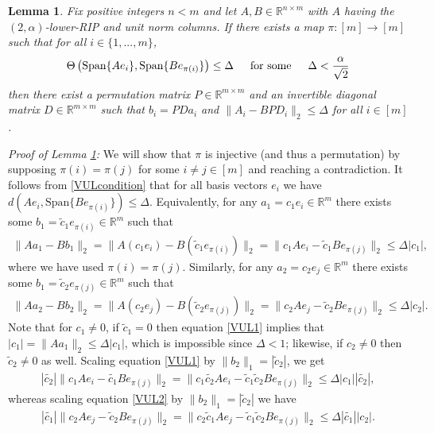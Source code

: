 \documentclass[journal,onecolumn]{IEEEtran}
\newtheorem{lemma}{Lemma}
\begin{document}

\begin{lemma}\label{VectorUniquenessLemma}
Fix positive integers $n < m$ and let $A,B \in \mathbb{R}^{n \times m}$ with $A$ having the $(2,\alpha)$-lower-RIP and unit norm columns. If there exists a map $\pi: [m] \to [m]$ such that for all $i \in \{1, ..., m \}$,
\begin{align}\label{VULcondition}
\Theta\left( \text{Span}\{Ae_i\}, \text{Span}\{Be_{\pi(i)}\} \right) \leq \Delta \indent \text{for some} \indent \Delta < \frac{\alpha}{\sqrt{2}} 
\end{align}
%
then there exist a permutation matrix $P \in \mathbb{R}^{m \times m}$ and an invertible diagonal matrix $D \in \mathbb{R}^{m \times m}$ such that $b_i = PDa_i$ and $\|A_i - BPD_i\|_2 \leq \Delta$ for all $i \in [m]$.
\end{lemma}

\emph{Proof of Lemma \ref{VectorUniquenessLemma}:} 
We will show that $\pi$ is injective (and thus a permutation) by supposing $\pi(i) = \pi(j)$ for some $i \neq j \in [m]$ and reaching a contradiction. It follows from \eqref{VULcondition} that for all basis vectors $e_i$ we have $d(Ae_i, \text{Span}\{Be_{\pi(i)}\}) \leq \Delta$. Equivalently, for any $a_1 = c_1e_i \in \mathbb{R}^m$ there exists some $b_1 = \tilde c_1 e_{\pi(i)} \in \mathbb{R}^m$ such that
\begin{align}\label{VUL1}
\|Aa_1 - Bb_1\|_2 = \|A(c_1e_i) - B(\tilde{c}_1e_{\pi(i)})\|_2 = \|c_1Ae_i - \tilde{c}_1Be_{\pi(j)}\|_2 \leq \Delta |c_1|,
\end{align}
%
where we have used $\pi(i) = \pi(j)$. Similarly, for any $a_2 = c_2e_j \in \mathbb{R}^m$ there exists some $b_1 = \tilde c_2 e_{\pi(j)} \in \mathbb{R}^m$ such that
\begin{align}\label{VUL2}
\|Aa_2 - Bb_2\|_2 = \|A(c_2e_j) - B(\tilde{c}_2e_{\pi(j)})\|_2 = \|c_2Ae_j - \tilde{c}_2Be_{\pi(j)}\|_2 \leq \Delta |c_2|.
\end{align}
Note that for $c_1 \neq 0$, if $\tilde c_1 = 0$ then equation \eqref{VUL1} implies that $|c_1| =\|Aa_1\|_2 \leq \Delta |c_1|$, which is impossible since $\Delta < 1$; likewise, if $c_2 \neq 0$ then $\tilde c_2 \neq 0$ as well. Scaling equation \eqref{VUL1} by $\|b_2\|_1 = |\tilde c_2|$, we get
\begin{align}\label{VUL3}
|\tilde{c_2}| \|c_1Ae_i - \tilde{c_1}Be_{\pi(j)}\|_2 = \|c_1\tilde{c_2}Ae_i - \tilde{c}_1\tilde{c}_2Be_{\pi(j)}\|_2 \leq \Delta |c_1||\tilde{c_2}|,
\end{align}
%
whereas scaling equation \eqref{VUL2} by $\|b_2\|_1 = |\tilde c_2|$ we have
\begin{align}\label{VUL4}
|\tilde{c_1}|\|c_2Ae_j - \tilde{c}_2Be_{\pi(j)}\|_2 = \|c_2\tilde{c}_1Ae_j - \tilde{c}_1\tilde{c}_2Be_{\pi(j)}\|_2 \leq \Delta |\tilde{c_1}| |c_2|.
\end{align}
\end{document}
